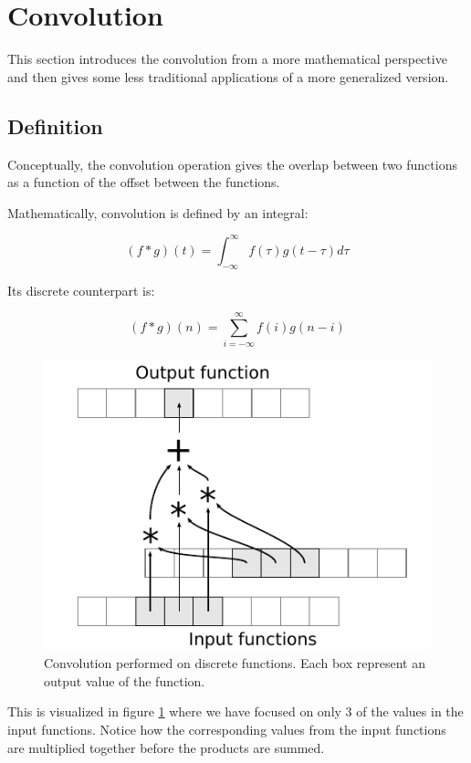 \section{Convolution}
This section introduces the convolution from a more mathematical perspective and then gives some less traditional applications of a more generalized version.

\subsection{Definition}
Conceptually, the convolution operation gives the overlap between two functions as a function of the offset between the functions.

Mathematically, convolution is defined by an integral:

\[
    (f * g)(t) = \int^{\infty}_{-\infty}{f(\tau)g(t-\tau) d\tau}
\]

Its discrete counterpart is:

\[
    (f * g)(n) = \sum^{\infty}_{i=-\infty}{f(i)g(n-i)}
\]

\begin{figure}
    \centering
    \includegraphics{img/VisualConvolution}
    \caption{
        Convolution performed on discrete functions.
        Each box represent an output value of the function.
    }
    \label{fig:VisualConvolution}
\end{figure}

This is visualized in figure \ref{fig:VisualConvolution} where we have focused on only 3 of the values in the input functions. Notice how the corresponding values from the input functions are multiplied together before the products are summed.


